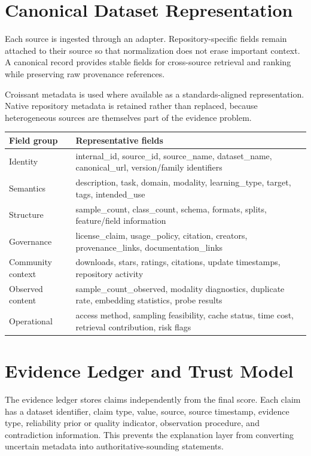 \documentclass[11pt]{article}
\begin{document}
\section{Canonical Dataset Representation}
Each source is ingested through an adapter. Repository-specific fields remain attached to their source so
that normalization does not erase important context. A canonical record provides stable fields for
cross-source retrieval and ranking while preserving raw provenance references.

Croissant metadata is used where available as a standards-aligned representation. Native repository
metadata is retained rather than replaced, because heterogeneous sources are themselves part of the
evidence problem.

\begin{longtable}{@{}L{3.2cm}L{10.9cm}@{}}
\toprule
\textbf{Field group} & \textbf{Representative fields} \\
\midrule
\endhead
Identity & internal\_id, source\_id, source\_name, dataset\_name, canonical\_url, version/family
  identifiers \\
Semantics & description, task, domain, modality, learning\_type, target, tags, intended\_use \\
Structure & sample\_count, class\_count, schema, formats, splits, feature/field information \\
Governance & license\_claim, usage\_policy, citation, creators, provenance\_links, documentation\_links \\
Community context & downloads, stars, ratings, citations, update timestamps, repository activity \\
Observed content & sample\_count\_observed, modality diagnostics, duplicate rate, embedding statistics,
  probe results \\
Operational & access method, sampling feasibility, cache status, time cost, retrieval contribution, risk
  flags \\
\bottomrule
\end{longtable}

\section{Evidence Ledger and Trust Model}
\label{sec:evidence}
The evidence ledger stores claims independently from the final score. Each claim has a dataset identifier,
claim type, value, source, source timestamp, evidence type, reliability prior or quality indicator,
observation procedure, and contradiction information. This prevents the explanation layer from converting
uncertain metadata into authoritative-sounding statements.
\end{document}

